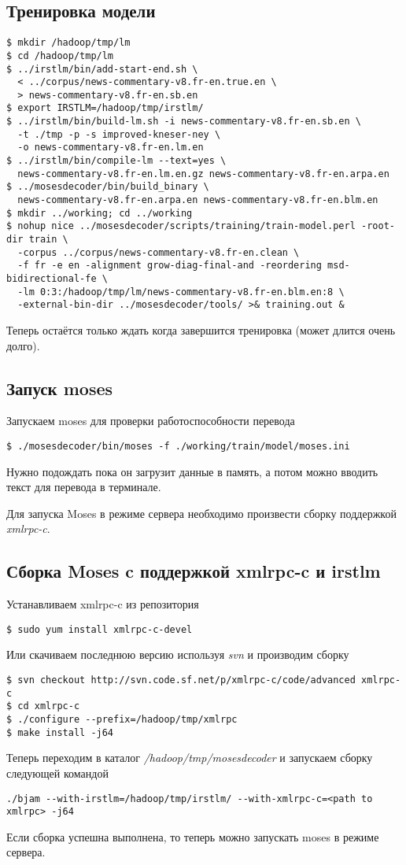 \subsection{Тренировка модели}
\begin{lstlisting}
$ mkdir /hadoop/tmp/lm
$ cd /hadoop/tmp/lm
$ ../irstlm/bin/add-start-end.sh \
  < ../corpus/news-commentary-v8.fr-en.true.en \
  > news-commentary-v8.fr-en.sb.en
$ export IRSTLM=/hadoop/tmp/irstlm/
$ ../irstlm/bin/build-lm.sh -i news-commentary-v8.fr-en.sb.en \
  -t ./tmp -p -s improved-kneser-ney \
  -o news-commentary-v8.fr-en.lm.en
$ ../irstlm/bin/compile-lm --text=yes \
  news-commentary-v8.fr-en.lm.en.gz news-commentary-v8.fr-en.arpa.en
$ ../mosesdecoder/bin/build_binary \
  news-commentary-v8.fr-en.arpa.en news-commentary-v8.fr-en.blm.en
$ mkdir ../working; cd ../working
$ nohup nice ../mosesdecoder/scripts/training/train-model.perl -root-dir train \
  -corpus ../corpus/news-commentary-v8.fr-en.clean \
  -f fr -e en -alignment grow-diag-final-and -reordering msd-bidirectional-fe \
  -lm 0:3:/hadoop/tmp/lm/news-commentary-v8.fr-en.blm.en:8 \
  -external-bin-dir ../mosesdecoder/tools/ >& training.out &
\end{lstlisting}
Теперь остаётся только ждать когда завершится тренировка (может длится очень долго).

\subsection{Запуск moses}
Запускаем moses для проверки работоспособности перевода
\begin{lstlisting}
$ ./mosesdecoder/bin/moses -f ./working/train/model/moses.ini
\end{lstlisting}
Нужно подождать пока он загрузит данные в память, а потом можно вводить текст для перевода в терминале.

Для запуска Moses в режиме сервера необходимо произвести сборку поддержкой \emph{xmlrpc-c}.

\subsection{Сборка Moses c поддержкой xmlrpc-c и irstlm}
Устанавливаем xmlrpc-c из репозитория
\begin{lstlisting}
$ sudo yum install xmlrpc-c-devel
\end{lstlisting}

Или скачиваем последнюю версию используя \emph{svn} и производим сборку
\begin{lstlisting}
$ svn checkout http://svn.code.sf.net/p/xmlrpc-c/code/advanced xmlrpc-c
$ cd xmlrpc-c
$ ./configure --prefix=/hadoop/tmp/xmlrpc
$ make install -j64
\end{lstlisting}

Теперь переходим в каталог \emph{/hadoop/tmp/mosesdecoder} и запускаем сборку следующей командой
\begin{lstlisting}
./bjam --with-irstlm=/hadoop/tmp/irstlm/ --with-xmlrpc-c=<path to xmlrpc> -j64
\end{lstlisting}
Если сборка успешна выполнена, то теперь можно запускать moses в режиме сервера.